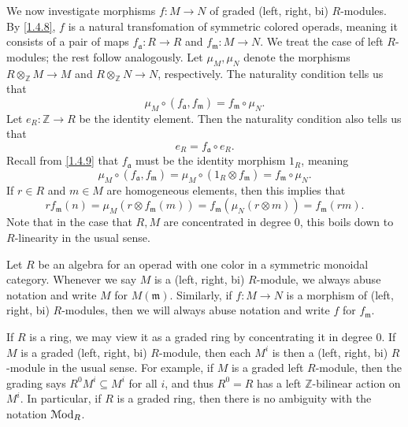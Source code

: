 \begin{discussion}
	We now investigate morphisms $f : M \to N$ of graded (left, right, bi) $R$-modules. By \cref{1.4.8}, $f$ is a natural transfomation of symmetric colored operads, meaning it consists of a pair of maps $f_\mathfrak{a} : R \to R$ and $f_\mathfrak{m} : M \to N$. We treat the case of left $R$-modules; the rest follow analogously. Let $\mu _M,\mu _N$ denote the morphisms $R\otimes_\mathbb{Z} M\to M$ and $R\otimes _\mathbb{Z} N\to N$, respectively. The naturality condition tells us that
	\[
		\mu_M \circ (f_\mathfrak{a} ,f_\mathfrak{m} )=f_\mathfrak{m} \circ \mu _N
	.\]
	Let $e_R : \mathbb{Z}  \to R$ be the identity element. Then the naturality condition also tells us that
	\[
		e_R =f_\mathfrak{a} \circ e_R
	.\]
	Recall from \cref{1.4.9} that $f_\mathfrak{a} $ must be the identity morphism $1_R$, meaning
	\[
		\mu _M \circ (f_\mathfrak{a} ,f_\mathfrak{m} ) = \mu _M \circ (1_R \otimes f_\mathfrak{m} ) = f_\mathfrak{m} \circ \mu _N
	.\]
	If $r\in R$ and $m\in M$ are homogeneous elements, then this implies that
	\[
		rf_\mathfrak{m} (n)=\mu_M(r \otimes f_\mathfrak{m} (m)) = f_\mathfrak{m} (\mu _N(r \otimes m)) = f_\mathfrak{m} (rm)
	.\]
	Note that in the case that $R,M$ are concentrated in degree 0, this boils down to $R$-linearity in the usual sense.
\end{discussion}

\begin{terminology}\label{1.4.12}
	Let $R$ be an algebra for an operad with one color in a symmetric monoidal category. Whenever we say $M$ is a (left, right, bi) $R$-module, we always abuse notation and write $M$ for $M(\mathfrak{m} )$. Similarly, if $f : M \to N$ is a morphism of (left, right, bi) $R$-modules, then we will always abuse notation and write $f$ for $f_\mathfrak{m} $.
\end{terminology}


\begin{remark}\label{1.4.13}
	If $R$ is a ring, we may view it as a graded ring by concentrating it in degree 0. If $M$ is a graded (left, right, bi) $R$-module, then each $M^i$ is then a (left, right, bi) $R$-module in the usual sense. For example, if $M$ is a graded left $R$-module, then the grading says $R^0M^i \subseteq M^i$ for all $i$, and thus $R^0=R$ has a left $\mathbb{Z} $-bilinear action on $M^i$. In particular, if $R$ is a graded ring, then there is no ambiguity with the notation $\mathcal{M}\mathrm{od} _R$.
\end{remark}

